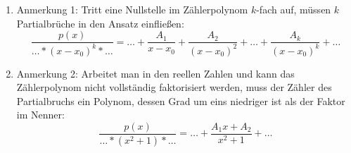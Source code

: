 \begin{enumerate}
    \item Anmerkung 1: Tritt eine Nullstelle im Zählerpolynom $k$-fach auf, müssen $k$ Partialbrüche in den Ansatz einfließen:
    $$
        \frac{p(x)}{\dots * (x-x_0)^k * \dots} = \dots + \frac{A_1}{x-x_0} + \frac{A_2}{(x-x_0)^2} + \dots + \frac{A_k}{(x-x_0)^k} + \dots
    $$
    \item Anmerkung 2: Arbeitet man in den reellen Zahlen und kann das Zählerpolynom nicht vollständig faktorisiert werden, muss der Zähler des Partialbruchs ein Polynom, dessen Grad um eins niedriger ist als der Faktor im Nenner:
    $$
        \frac{p(x)}{\dots * (x^2+1) * \dots} = \dots + \frac{A_1x+A_2}{x^2+1} + \dots
    $$
\end{enumerate}